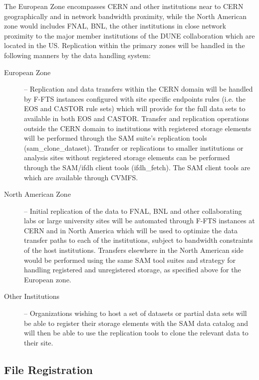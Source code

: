 \documentclass[12pt]{article}
\begin{document}
{The European Zone encompasses CERN and other institutions near to CERN geographically and in network bandwidth proximity,
while the North American zone would includes  FNAL, BNL, the other institutions
in close network proximity to the major member institutions of the DUNE collaboration which are located in the US.
Replication within the primary zones will be handled in the following manners by the data handling system:

\begin{description}
\item[European Zone] -- Replication and data transfers within the CERN domain will be handled by F-FTS instances configured
with site specific endpoints rules (i.e. the EOS and CASTOR rule sets) which will provide for the full data sets to available in
both EOS and CASTOR.  Transfer and replication operations outside the CERN domain to institutions with registered storage
elements will be performed through the SAM suite’s replication tools (sam\_clone\_dataset).  Transfer or replications to smaller
institutions or analysis sites without registered storage elements can be performed through the SAM/ifdh client tools (ifdh\_fetch).
The SAM client tools are which are available through CVMFS.  

\item[North American Zone] -- Initial replication of the data to FNAL, BNL and other collaborating labs or large university sites will be
automated through F-FTS instances at CERN and in North America which will be used to optimize the data transfer paths to each of
the institutions, subject to bandwidth constraints of the host institutions.   Transfers elsewhere in the North American side would be
performed using the same SAM tool suites and strategy for handling registered and unregistered storage, as specified above for the European zone. 

\item[Other Institutions] -- Organizations wishing to host a set of datasets or partial data sets will be able to register their storage
elements with the SAM data catalog and will then be able to use the replication tools to clone the relevant data to their site. 
\end{description}

\subsection{File Registration}

}
\end{document}
